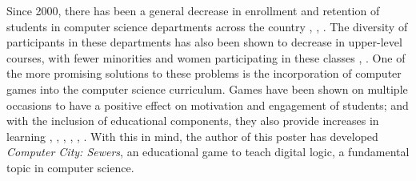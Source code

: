 Since 2000, there has been a general decrease in enrollment and retention of students in computer science departments across the country \citep{Sung}, \citep{Wu}, \citep{Leutenegger}.  The diversity of participants in these departments has also been shown to decrease in upper-level courses, with fewer minorities and women participating in these classes \citep{Sung}, \citep{Wu}.  One of the more promising solutions to these problems is the incorporation of computer games into the computer science curriculum.  Games have been shown on multiple occasions to have a positive effect on motivation and engagement of students; and with the inclusion of educational components, they also provide increases in learning \citep{Wu}, \citep{deLaet}, \citep{Bayliss}, \citep{Wolz}, \citep{Flavor}, \citep{Belfore}.  With this in mind, the author of this poster has developed \textit{Computer City:  Sewers}, an educational game to teach digital logic, a fundamental topic in computer science.